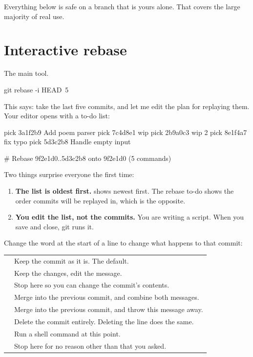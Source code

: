 \documentclass[11pt]{article}
\begin{document}
Everything below is safe on a branch that is yours alone. That covers the large
majority of real use.

\section{Interactive rebase}

The main tool.

\begin{shell}
git rebase -i HEAD~5
\end{shell}

This says: take the last five commits, and let me edit the plan for replaying them.
Your editor opens with a to-do list:

\begin{terminal}
pick 3a1f2b9 Add poem parser
pick 7c4d8e1 wip
pick 2b9a0c3 wip 2
pick 8e1f4a7 fix typo
pick 5d3c2b8 Handle empty input

# Rebase 9f2e1d0..5d3c2b8 onto 9f2e1d0 (5 commands)
\end{terminal}

Two things surprise everyone the first time:

\begin{enumerate}
  \item \textbf{The list is oldest first.}  shows newest first. The
    rebase to-do shows the order commits will be replayed in, which is the opposite.
  \item \textbf{You edit the list, not the commits.} You are writing a script. When
    you save and close, git runs it.
\end{enumerate}

Change the word at the start of a line to change what happens to that commit:

\vspace{0.5em}
\begin{tabularx}{\linewidth}{@{}L{3.2cm} X@{}}
\toprule
{} &  \\
\midrule
{} & Keep the commit as it is. The default. \\
 & Keep the changes, edit the message. \\
 & Stop here so you can change the commit's contents. \\
 & Merge into the previous commit, and combine both messages. \\
 & Merge into the previous commit, and throw this message away. \\
 & Delete the commit entirely. Deleting the line does the same. \\
 & Run a shell command at this point. \\
 & Stop here for no reason other than that you asked. \\
\bottomrule
\end{tabularx}
\vspace{0.5em}
\end{document}
